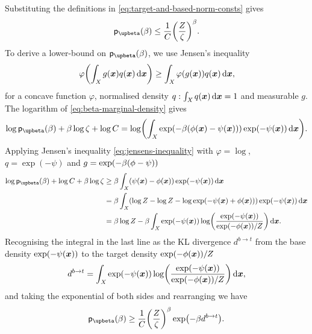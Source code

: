 Substituting the definitions in \eqref{eq:target-and-based-norm-consts} gives
\begin{equation}
  \pden{\upbeta}(\beta) \leq \frac{1}{C} \lpa \frac{Z}{\zeta} \rpa^\beta.
\end{equation}
To derive a lower-bound on $\pden{\upbeta}(\beta)$, we use Jensen's inequality
\begin{equation}\label{eq:jensens-inequality}
  \varphi\lpa \int_{\set{X}} g(\vct{x}) q(\vct{x}) \,\dr\vct{x}\rpa \geq
 \int_{\set{X}} \varphi\lpa g(\vct{x}) \rpa q(\vct{x}) \,\dr\vct{x},
\end{equation}
for a concave function $\varphi$, normalised density $q : \int_{\mathit{X}} q(\boldsymbol{x}) \,\mathrm{d}\boldsymbol{x} = 1$ and measurable $g$. The logarithm of \eqref{eq:beta-marginal-density} gives
\begin{equation}
  \log\pden{\upbeta}(\beta) + \beta\log\zeta + \log C
  =
  \log\lpa
  \int_\set{X} 
    \exp\lpa-\beta\lpa\phi(\vct{x}) - \psi(\vct{x})\rpa\rpa \exp\lpa-\psi(\vct{x})\rpa
  \,\dr\vct{x}
  \rpa.
\end{equation}
Applying Jensen's inequality \eqref{eq:jensens-inequality} with $\varphi = \log$, $q = \exp(-\psi)$ and $g = \exp\lpa-\beta\lpa\phi - \psi\rpa\rpa$
\begin{align}
  \log\pden{\upbeta}(\beta) + \log C + \beta\log\zeta
  &\geq
  \beta
  \int_\set{X} 
    \lpa\psi(\vct{x}) - \phi(\vct{x})\rpa \exp\lpa-\psi(\vct{x})\rpa
  \,\dr\vct{x}\\
  &=
  \beta
  \int_\set{X} 
    \lpa
    \log Z - \log Z -
    \log\exp\lpa-\psi(\vct{x}) + \phi(\vct{x})\rpa
    \rpa 
    \exp\lpa-\psi(\vct{x})\rpa
  \,\dr\vct{x}
  \\ 
  &=
  \beta\log Z
  -\beta
  \int_\set{X} 
    \exp\lpa-\psi(\vct{x})\rpa \log\lpa\frac{\exp\lpa-\psi(\vct{x})\rpa}{\exp\lpa-\phi(\vct{x})\rpa / Z}\rpa
  \,\dr\vct{x}.
\end{align}
Recognising the integral in the last line as the \ac{KL} divergence $d^{b\to t}$ from the base density $\exp\lpa-\psi(\vct{x})\rpa$ to the target density $\exp\lpa-\phi(\vct{x})\rpa / Z$
\begin{equation}
  d^{b\to t} = \int_{\set{X}} 
    \exp\lpa -\psi(\vct{x})\rpa \log\lpa\frac{\exp\lpa -\psi(\vct{x})\rpa}{\exp\lpa -\phi(\vct{x})\rpa / Z}\rpa
  \,\dr\vct{x},
\end{equation} 
and taking the exponential of both sides and rearranging we have
\begin{equation}
  \pden{\upbeta}(\beta) \geq
  \frac{1}{C} \lpa \frac{Z}{\zeta} \rpa^\beta \exp\lpa -\beta d^{b\to t}\rpa.
\end{equation}
